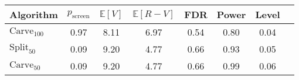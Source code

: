 \begin{tabular}{|l|c|c|c|c|c|c|c|}
\hline
            Algorithm &  $p_{\text{screen}}$ &  $\mathbb{E}[V]$ &  $\mathbb{E}[R-V]$ &  FDR &  Power &  Level \\
\hline
 $\text{Carve}_{100}$ &                 0.97 &             8.11 &               6.97 & 0.54 &   0.80 &   0.04 \\
  $\text{Split}_{50}$ &                 0.09 &             9.20 &               4.77 & 0.66 &   0.93 &   0.05 \\
  $\text{Carve}_{50}$ &                 0.09 &             9.20 &               4.77 & 0.66 &   0.99 &   0.06 \\
\hline
\end{tabular}
